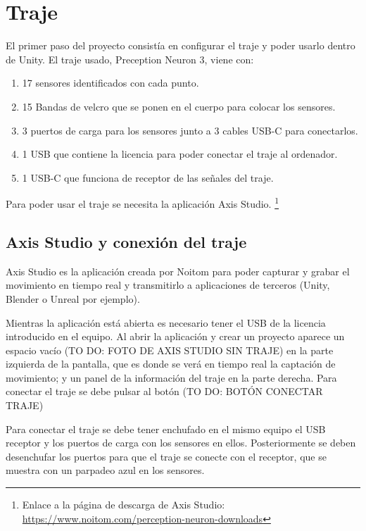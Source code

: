\section{Traje}
\label{sec:traje}

El primer paso del proyecto consistía en configurar el traje y poder usarlo dentro de Unity.
El traje usado, Preception Neuron 3, viene con:

\begin{enumerate}
    \renewcommand{\theenumi}{\alph{enumi}}
    \item 17 sensores identificados con cada punto.
    \item 15 Bandas de velcro que se ponen en el cuerpo para colocar los sensores.
    \item 3 puertos de carga para los sensores junto a 3 cables USB-C para conectarlos.
    \item 1 USB que contiene la licencia para poder conectar el traje al ordenador.
    \item 1 USB-C que funciona de receptor de las señales del traje.
\end{enumerate}

Para poder usar el traje se necesita la aplicación Axis Studio. \footnote{Enlace a la página de descarga de Axis Studio: \url{https://www.noitom.com/perception-neuron-downloads}}
\subsection{Axis Studio y conexión del traje}
Axis Studio es la aplicación creada por Noitom para poder capturar y grabar el movimiento en tiempo real y transmitirlo a aplicaciones de terceros (Unity, Blender o Unreal por ejemplo).

Mientras la aplicación está abierta es necesario tener el USB de la licencia introducido en el equipo.
Al abrir la aplicación y crear un proyecto aparece un espacio vacío (TO DO: FOTO DE AXIS STUDIO SIN TRAJE) en la parte izquierda de la pantalla, que es donde se verá en tiempo real la captación de movimiento; y un panel de la información del traje en la parte derecha. Para conectar el traje se debe pulsar al botón (TO DO: BOTÓN CONECTAR TRAJE)

Para conectar el traje se debe tener enchufado en el mismo equipo el USB receptor y los puertos de carga con los sensores en ellos.
Posteriormente se deben desenchufar los puertos para que el traje se conecte con el receptor, que se muestra con un parpadeo azul en los sensores.

